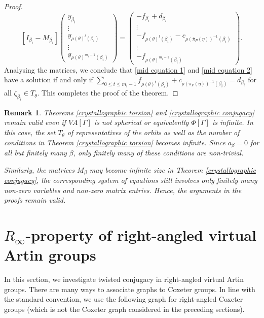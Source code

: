 \documentclass[12pt]{amsart}
\newtheorem{remark}[equation]{Remark}
\numberwithin{equation}{section}
\begin{document}
\begin{proof}
$$
[I_{\beta_i}-M_{\beta_i}]
\left(\begin{matrix}
	y_{\beta_i}\\
	\vdots\\
		y_{\rho(\theta)^l(\beta_i)}\\
	\vdots\\
	y_{\rho(\theta)^{m_{i}-1}(\beta_i)}
\end{matrix}\right)=
\left(\begin{matrix}	-f_{\beta_i}+d_{\beta_i}\\
	\vdots\\
		-f_{\rho(\theta)^l(\beta_i)}-c_{\rho(\overline{\pi}_P(\eta))^{-1}(\beta_i)}\\
	\vdots\\
	-f_{\rho(\theta)^{m_{i}-1}(\beta_i)}
\end{matrix}\right).
$$ 
Analysing the matrices, we conclude that \eqref{mid equation 1} and \eqref{mid equation 2} have a solution if and only if $\sum_{0\le t \le m_i-1}f_{\rho(\theta)^{t}(\beta_i)}+c_{\rho(\overline{\pi}_P(\eta))^{-1}(\beta_i)}=d_{\beta_i}$ for all $\zeta_{\beta_i}\in T_{\theta}$. This completes the proof of the theorem.
\end{proof}

\begin{remark}
Theorems \ref{crystallographic torsion} and \ref{crystallographic conjugacy} remain valid even if $VA[\Gamma]$ is not spherical or equivalently $\Phi[\Gamma]$ is infinite. In this case, the set $T_\theta$ of representatives of the orbits as well as the number of conditions in  Theorem \ref{crystallographic torsion} becomes infinite. Since $a_\beta = 0$ for all but finitely many $\beta$, only finitely many of these conditions are non-trivial. 
\par
Similarly,  the matrices $M_\beta$ may become infinite size in Theorem \ref{crystallographic conjugacy},  the corresponding system of equations still involves only finitely many non-zero variables and non-zero matrix entries. Hence, the arguments in the proofs remain valid.
\end{remark}
\medskip


\section{$R_\infty$-property of right-angled virtual Artin groups} \label{section twisted conjugacy}
In this section, we investigate twisted conjugacy in right-angled virtual Artin groups. There are many ways to associate graphs to Coxeter groups. In line with the standard convention, we use the following graph for right-angled Coxeter groups (which is not the Coxeter graph considered in the preceding sections).
\par
\end{document}
